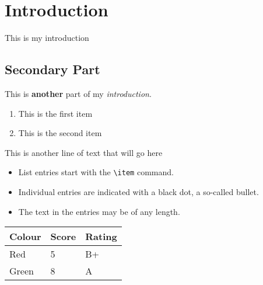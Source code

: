 \section{Introduction}
This is my introduction

\subsection{Secondary Part}
This is \textbf{another} part of my \textit{introduction}.

\begin{enumerate}
    \item This is the first item
    \item This is the second item
\end{enumerate}

This is another line of text that will go here

\begin{itemize}
  \item List entries start with the \verb|\item| command.
  \item Individual entries are indicated with a black dot, a so-called bullet.
  \item The text in the entries may be of any length.
\end{itemize}

\begin{table}[h]
\begin{tabular}{lll}
\hline
Colour & Score & Rating \\ \hline
Red    & 5     & B+     \\
Green  & 8     & A      \\ \hline
\end{tabular}
\end{table}